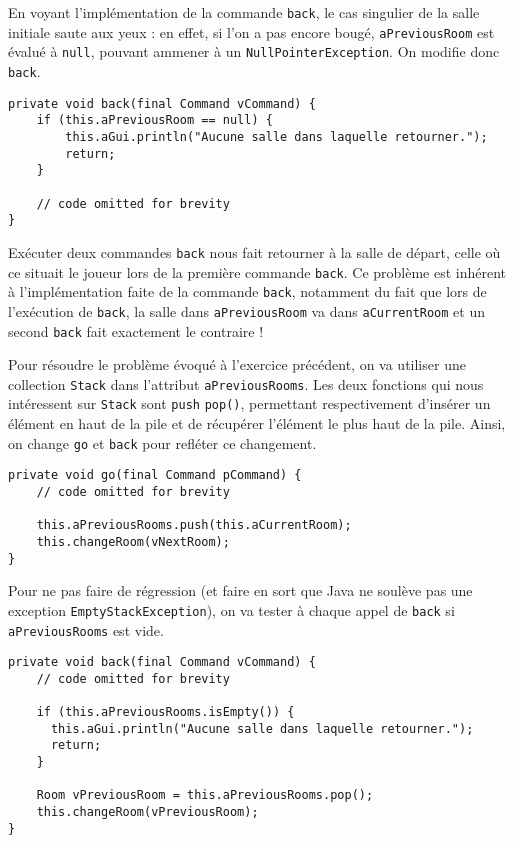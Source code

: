 \begin{exercise}[subtitle=Test de la commande back]

En voyant l'implémentation de la commande \verb|back|, le cas singulier de la salle initiale saute aux yeux : en effet, si l'on a pas encore bougé, \verb|aPreviousRoom| est évalué à \verb|null|, pouvant ammener à un \verb|NullPointerException|. On modifie donc \verb|back|.

\begin{verbatim}
private void back(final Command vCommand) {
    if (this.aPreviousRoom == null) {
        this.aGui.println("Aucune salle dans laquelle retourner.");
        return;
    }
    
    // code omitted for brevity
}
\end{verbatim}
\end{exercise}

\begin{exercise}[subtitle=back back]

Exécuter deux commandes \verb|back| nous fait retourner à la salle de départ, celle où ce situait le joueur lors de la première commande \verb|back|. Ce problème est inhérent à l'implémentation faite de la commande \verb|back|, notamment du fait que lors de l'exécution de \verb|back|, la salle dans \verb|aPreviousRoom| va dans \verb|aCurrentRoom| et un second \verb|back| fait exactement le contraire !

\end{exercise}

\begin{exercise}[subtitle=Stack]

Pour résoudre le problème évoqué à l'exercice précédent, on va utiliser une collection \verb|Stack| dans l'attribut \verb|aPreviousRooms|. Les deux fonctions qui nous intéressent sur \verb|Stack| sont \verb|push| \verb|pop()|, permettant respectivement d'insérer un élément en haut de la pile et de récupérer l'élément le plus haut de la pile. Ainsi, on change \verb|go| et \verb|back| pour refléter ce changement.

\begin{verbatim}
private void go(final Command pCommand) {
    // code omitted for brevity
    
    this.aPreviousRooms.push(this.aCurrentRoom);
    this.changeRoom(vNextRoom);
}
\end{verbatim}

Pour ne pas faire de régression (et faire en sort que Java ne soulève pas une exception \verb|EmptyStackException|), on va tester à chaque appel de \verb|back| si \verb|aPreviousRooms| est vide.

\begin{verbatim}
private void back(final Command vCommand) {
    // code omitted for brevity
    
    if (this.aPreviousRooms.isEmpty()) {
      this.aGui.println("Aucune salle dans laquelle retourner.");
      return;
    }
    
    Room vPreviousRoom = this.aPreviousRooms.pop();
    this.changeRoom(vPreviousRoom);
}
\end{verbatim}
\end{exercise}
